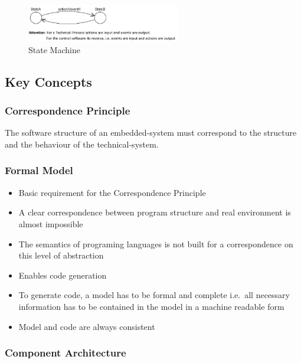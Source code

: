 \begin{figure}[H]
\centering
\includegraphics[width=0.6\textwidth]{figures/stateMachine.png}
\caption{State Machine}
\end{figure}

\hypertarget{key-concepts}{%
\subsection{Key Concepts}\label{key-concepts}}

\hypertarget{correspondence-principle}{%
\subsubsection{Correspondence
Principle}\label{correspondence-principle}}

The software structure of an embedded-system must correspond to the
structure and the behaviour of the technical-system.

\hypertarget{formal-model}{%
\subsubsection{Formal Model}\label{formal-model}}

\begin{itemize}
\tightlist
\item
  Basic requirement for the Correspondence Principle
\item
  A clear correspondence between program structure and real environment
  is almost impossible
\item
  The semantics of programing languages is not built for a
  correspondence on this level of abstraction
\item
  Enables code generation
\item
  To generate code, a model has to be formal and complete i.e.~all
  necessary information has to be contained in the model in a machine
  readable form
\item
  Model and code are always consistent
\end{itemize}

\hypertarget{component-architecture}{%
\subsubsection{Component Architecture}\label{component-architecture}}

